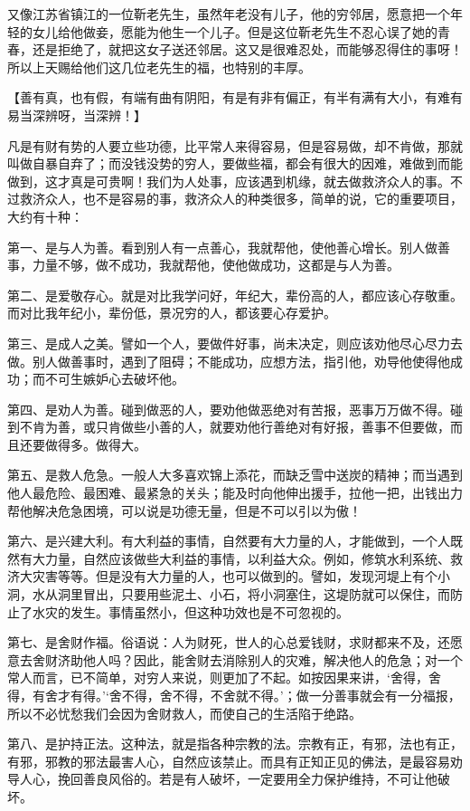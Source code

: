 \documentclass[12pt,twoside,openany]{book}
\newcommand{\kai}[1]{{\CJKfamily{kai}#1}}
\begin{document}
又像江苏省镇江的一位靳老先生，虽然年老没有儿子，他的穷邻居，愿意把一个年轻的女儿给他做妾，愿能为他生一个儿子。但是这位靳老先生不忍心误了她的青春，还是拒绝了，就把这女子送还邻居。这又是很难忍处，而能够忍得住的事呀！所以上天赐给他们这几位老先生的福，也特别的丰厚。

【\kai{善有真，也有假，有端有曲有阴阳，有是有非有偏正，有半有满有大小，有难有易当深辨呀，当深辨！}】

凡是有财有势的人要立些功德，比平常人来得容易，但是容易做，却不肯做，那就叫做自暴自弃了；而没钱没势的穷人，要做些福，都会有很大的因难，难做到而能做到，这才真是可贵啊！我们为人处事，应该遇到机缘，就去做救济众人的事。不过救济众人，也不是容易的事，救济众人的种类很多，简单的说，它的重要项目，大约有十种：

第一、是与人为善。看到别人有一点善心，我就帮他，使他善心增长。别人做善事，力量不够，做不成功，我就帮他，使他做成功，这都是与人为善。

第二、是爱敬存心。就是对比我学问好，年纪大，辈份高的人，都应该心存敬重。而对比我年纪小，辈份低，景况穷的人，都该要心存爱护。

第三、是成人之美。譬如一个人，要做件好事，尚未决定，则应该劝他尽心尽力去做。别人做善事时，遇到了阻碍；不能成功，应想方法，指引他，劝导他使得他成功；而不可生嫉妒心去破坏他。

第四、是劝人为善。碰到做恶的人，要劝他做恶绝对有苦报，恶事万万做不得。碰到不肯为善，或只肯做些小善的人，就要劝他行善绝对有好报，善事不但要做，而且还要做得多。做得大。

第五、是救人危急。一般人大多喜欢锦上添花，而缺乏雪中送炭的精神；而当遇到他人最危险、最困难、最紧急的关头；能及时向他伸出援手，拉他一把，出钱出力帮他解决危急困境，可以说是功德无量，但是不可以引以为傲！

第六、是兴建大利。有大利益的事情，自然要有大力量的人，才能做到，一个人既然有大力量，自然应该做些大利益的事情，以利益大众。例如，修筑水利系统、救济大灾害等等。但是没有大力量的人，也可以做到的。譬如，发现河堤上有个小洞，水从洞里冒出，只要用些泥土、小石，将小洞塞住，这堤防就可以保住，而防止了水灾的发生。事情虽然小，但这种功效也是不可忽视的。

第七、是舍财作福。俗语说：人为财死，世人的心总爱钱财，求财都来不及，还愿意去舍财济助他人吗？因此，能舍财去消除别人的灾难，解决他人的危急；对一个常人而言，已不简单，对穷人来说，则更加了不起。如按因果来讲，‘舍得，舍得，有舍才有得。’‘舍不得，舍不得，不舍就不得。’；做一分善事就会有一分福报，所以不必忧愁我们会因为舍财救人，而使自己的生活陷于绝路。

第八、是护持正法。这种法，就是指各种宗教的法。宗教有正，有邪，法也有正，有邪，邪教的邪法最害人心，自然应该禁止。而具有正知正见的佛法，是最容易劝导人心，挽回善良风俗的。若是有人破坏，一定要用全力保护维持，不可让他破坏。
\end{document}
